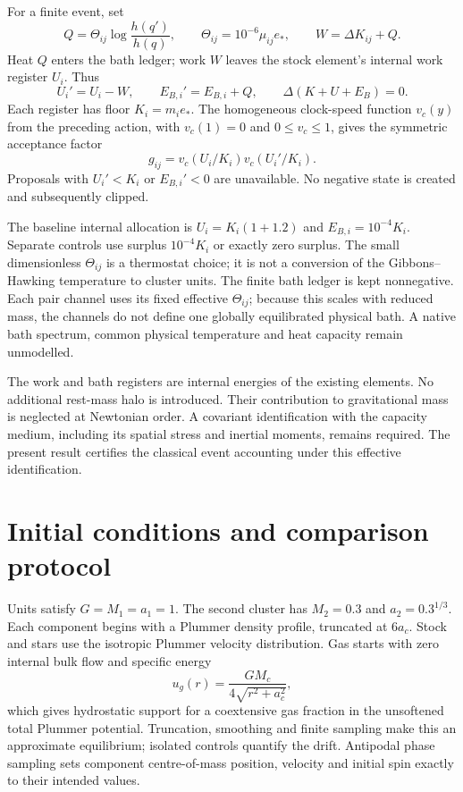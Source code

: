 \documentclass[11pt]{article}
\begin{document}
For a finite event, set
\begin{equation}
 Q=\Theta_{ij}\log\frac{h(q')}{h(q)},\qquad
 \Theta_{ij}=10^{-6}\mu_{ij}e_*,\qquad
 W=\Delta K_{ij}+Q.
\end{equation}
Heat $Q$ enters the bath ledger; work $W$ leaves the stock element's internal
work register $U_i$. Thus
\begin{equation}\label{eq:ledger}
 U_i'=U_i-W,\qquad E_{B,i}'=E_{B,i}+Q,\qquad
 \Delta(K+U+E_B)=0.
\end{equation}
Each register has floor $K_i=m_i e_*$. The homogeneous clock-speed function
$v_c(y)$ from the preceding action, with $v_c(1)=0$ and $0\le v_c\le1$,
gives the symmetric acceptance factor
\begin{equation}\label{eq:gate}
 g_{ij}=v_c(U_i/K_i)v_c(U_i'/K_i).
\end{equation}
Proposals with $U_i'<K_i$ or $E_{B,i}'<0$ are unavailable. No negative
state is created and subsequently clipped.

The baseline internal allocation is $U_i=K_i(1+1.2)$ and
$E_{B,i}=10^{-4}K_i$. Separate controls use surplus $10^{-4}K_i$ or exactly
zero surplus. The small dimensionless $\Theta_{ij}$ is a thermostat choice;
it is not a conversion of the Gibbons--Hawking temperature to cluster units.
The finite bath ledger is kept nonnegative. Each pair channel uses its fixed
effective $\Theta_{ij}$; because this scales with reduced mass, the channels
do not define one globally equilibrated physical bath. A native bath spectrum,
common physical temperature and heat capacity remain unmodelled.

The work and bath registers are internal energies of the existing elements.
No additional rest-mass halo is introduced. Their contribution to gravitational
mass is neglected at Newtonian order. A covariant identification with the
capacity medium, including its spatial stress and inertial moments, remains
required. The present result certifies the classical event accounting under
this effective identification.

\section{Initial conditions and comparison protocol}
Units satisfy $G=M_1=a_1=1$. The second cluster has $M_2=0.3$ and
$a_2=0.3^{1/3}$. Each component begins with a Plummer density profile,
truncated at $6a_c$. Stock and stars use the isotropic Plummer velocity
distribution. Gas starts with zero internal bulk flow and specific energy
\begin{equation}
 u_g(r)=\frac{GM_c}{4\sqrt{r^2+a_c^2}},
\end{equation}
which gives hydrostatic support for a coextensive gas fraction in the
unsoftened total Plummer potential. Truncation, smoothing and finite sampling
make this an approximate equilibrium; isolated controls quantify the drift.
Antipodal phase sampling sets component centre-of-mass position, velocity
and initial spin exactly to their intended values.
\end{document}
